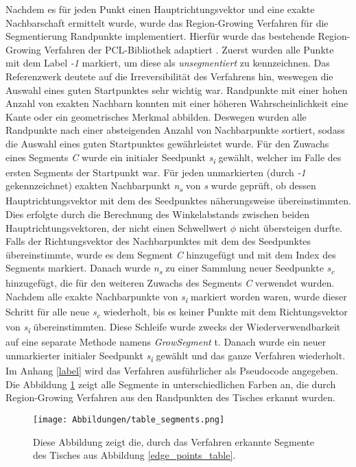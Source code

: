 Nachdem es für jeden Punkt einen Hauptrichtungsvektor und eine exakte Nachbarschaft ermittelt wurde, wurde das Region-Growing Verfahren für die Segmentierung Randpunkte implementiert. Hierfür wurde das bestehende Region-Growing Verfahren der PCL-Bibliothek adaptiert \autocite{rusu_3d_2011}. Zuerst wurden alle Punkte mit dem Label \textit{-1} markiert, um diese als \textit{unsegmentiert} zu kennzeichnen. Das Referenzwerk deutete auf die Irreversibilität des Verfahrens hin, weswegen die Auswahl eines guten Startpunktes sehr wichtig war. Randpunkte mit einer hohen Anzahl von exakten Nachbarn konnten mit einer höheren Wahrscheinlichkeit eine Kante oder ein geometrisches Merkmal abbilden. Deswegen wurden alle Randpunkte nach einer absteigenden Anzahl von Nachbarpunkte sortiert, sodass die Auswahl eines guten Startpunktes gewährleistet wurde. Für den Zuwachs eines Segments \textit{C} wurde ein initialer Seedpunkt \textit{s\textsubscript{i}} gewählt, welcher im Falle des ersten Segments der Startpunkt war. Für jeden unmarkierten (durch \textit{-1} gekennzeichnet) exakten Nachbarpunkt \textit{n\textsubscript{s}} von \textit{s} wurde geprüft, ob dessen Hauptrichtungsvektor mit dem des Seedpunktes näherungsweise übereinstimmten. Dies erfolgte durch die Berechnung des Winkelabstands zwischen beiden Hauptrichtungsvektoren, der nicht einen Schwellwert $\phi$ nicht übersteigen durfte. Falls der Richtungsvektor des Nachbarpunktes mit dem des Seedpunktes übereinstimmte, wurde es dem Segment \textit{C} hinzugefügt und mit dem Index des Segments markiert. Danach wurde \textit{n\textsubscript{s}} zu einer Sammlung neuer Seedpunkte \textit{s\textsubscript{c}} hinzugefügt, die für den weiteren Zuwachs des Segments \textit{C} verwendet wurden. Nachdem alle exakte Nachbarpunkte von \textit{s\textsubscript{i}} markiert worden waren, wurde dieser Schritt für alle neue \textit{s\textsubscript{c}} wiederholt, bis es keiner Punkte mit dem Richtungsvektor von \textit{s\textsubscript{i}} übereinstimmten. Diese Schleife wurde zwecks der Wiederverwendbarkeit auf eine separate Methode namens \textit{GrowSegment} t. Danach wurde ein neuer unmarkierter initialer Seedpunkt \textit{s\textsubscript{i}} gewählt und das ganze Verfahren wiederholt. Im Anhang \ref{label} wird das Verfahren ausführlicher als Pseudocode angegeben. Die Abbildung \ref{segments_table} zeigt alle Segmente in unterschiedlichen Farben an, die durch Region-Growing Verfahren aus den Randpunkten des Tisches erkannt wurden.

\begin{figure}[h]
	\texttt{[image: Abbildungen/table\_segments.png]}
	\centering
	\caption{Diese Abbildung zeigt die, durch das Verfahren erkannte  Segmente des Tisches aus Abbildung \ref{edge_points_table}.}
	\label{segments_table}
\end{figure}

